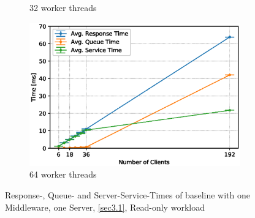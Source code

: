\documentclass[11pt,a4paper]{article}
\begin{document}
\begin{figure}
\begin{subfigure}{.5\textwidth}
        \caption{32 worker threads}
    \end{subfigure}
    \begin{subfigure}{.5\textwidth}
        \includegraphics[width=1\linewidth]{plots/3_1a_extendedLatencyMiddleware_64w.eps}
        \caption{64 worker threads}
    \end{subfigure}

    \caption{Response-, Queue- and Server-Service-Times of baseline with one Middleware, one Server, \autoref{sec3.1}, Read-only workload}
    \label{fig:3-1-times-readonly}
\end{figure}
\end{document}
